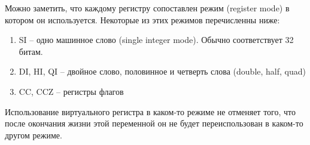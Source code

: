 \documentclass[a4paper,12pt,oneside]{article}
\begin{document}
Можно заметить, что каждому регистру сопоставлен режим (register mode) в котором он используется. Некоторые из этих режимов перечисленны ниже:

\begin{enumerate}
\item SI -- одно машинное слово (single integer mode). Обычно соответствует 32 битам.
\item DI, HI, QI -- двойное слово, половинное и четверть слова (double, half, quad)
\item CC, CCZ -- регистры флагов
\end{enumerate}

Использование виртуального регистра в каком-то режиме не отменяет того, что после окончания жизни этой переменной он не будет переиспользован в каком-то другом режиме.
\end{document}
